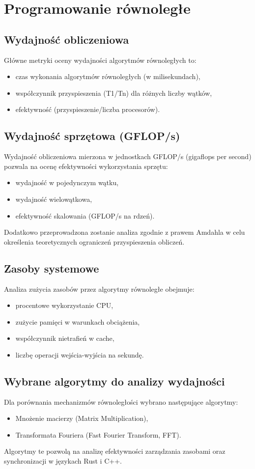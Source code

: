 \section{Programowanie równoległe}

\subsection{Wydajność obliczeniowa}
Główne metryki oceny wydajności algorytmów równoległych to:
\begin{itemize}
\item czas wykonania algorytmów równoległych (w milisekundach),
\item współczynnik przyspieszenia (T1/Tn) dla różnych liczby wątków,
\item efektywność (przyspieszenie/liczba procesorów).
\end{itemize}

\subsection{Wydajność sprzętowa (GFLOP/s)}
Wydajność obliczeniowa mierzona w jednostkach GFLOP/s (gigaflops per second) pozwala na ocenę efektywności wykorzystania sprzętu:
\begin{itemize}
\item wydajność w pojedynczym wątku,
\item wydajność wielowątkowa,
\item efektywność skalowania (GFLOP/s na rdzeń).
\end{itemize}
Dodatkowo przeprowadzona zostanie analiza zgodnie z prawem Amdahla w celu określenia teoretycznych ograniczeń przyspieszenia obliczeń.

\subsection{Zasoby systemowe}
Analiza zużycia zasobów przez algorytmy równoległe obejmuje:
\begin{itemize}
\item procentowe wykorzystanie CPU,
\item zużycie pamięci w warunkach obciążenia,
\item współczynnik nietrafień w cache,
\item liczbę operacji wejścia-wyjścia na sekundę.
\end{itemize}

\subsection{Wybrane algorytmy do analizy wydajności}
Dla porównania mechanizmów równoległości wybrano następujące algorytmy:
\begin{itemize}
\item Mnożenie macierzy (Matrix Multiplication),
\item Transformata Fouriera (Fast Fourier Transform, FFT).
\end{itemize}
Algorytmy te pozwolą na analizę efektywności zarządzania zasobami oraz synchronizacji w językach Rust i C++.


